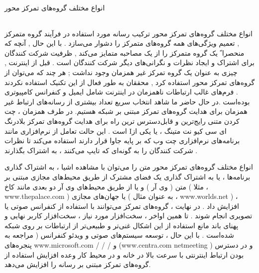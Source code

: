 \documentclass{beamer}
\begin{document}
\begin{persian}
\begin{frame}{انواع مختلف گروه‌های تمرکز محور}
\begin{tabular}{cccc}
	
	
\end{tabular}

\vspace{0.1cm}
\vspace{0.1cm}
\vspace{0.1cm}

\end{frame}


\begin{frame}{انواع مختلف گروه‌های تمرکز محور}
	ترکیب رسانه مورد استفاده در فرآیند گروه متمرکز , تعمیم ویژگی‌های همه گروه‌های متمرکز را دشوار می‌سازد . با این حال , آنچه که منحصرا ً یک گروه متمرکز را از یک مصاحبه متمایز می‌کند , ظرفیت شرکت کنندگان برای اشتراک و ایجاد نظرات و نگرانی‌های دیگر شرکت کنندگان است . قبل از اینترنت , چیزی به عنوان یک گروه تمرکز غیر همزمان وجود نداشت ; هر چند که می‌توان از گروه‌های تمرکز محور استفاده کرد , محققان به طور فعال از این تکنیک استفاده نکردند . فرم‌های غالب ارتباطات ناهمزمان در اینترنت شامل ایمیل و کنفرانس کامپیوتری بوده‌است .در حال حاضر ما شاهد انتخاب سریع تعداد بیشتری از رسانه‌های ارتباط غیر همزمان برای هدایت گروه‌های تمرکز مبتنی بر شبکه هستیم. در طرف همزمان ، چت کردن متنی رایج‌ترین و قابل‌دسترس ترین راه برای هدایت گروه‌های تمرکز بلادرنگ است . این حالت تعامل از نرم‌افزاری مانند Iای سی کیو نت متینگ ، یا یکی از برنامه‌های نرم‌افزاری چت وب که بر پایه جاوا قرار دارند استفاده می‌کند تا نظرات شرکت کنندگان را به گونه‌ای که تایپ می‌کنند ، به اشتراک بگذارند .
\end{frame}	
\begin{frame}{انواع مختلف گروه‌های تمرکز محور}
	متن را می‌توان با مشاهده اشیا ، به اشتراک گذاری برنامه‌ها ، یا به اشتراک گذاری یک فضای مشترک از طریق محیط‌های مجازی مبتنی بر متن ( وی آر ) و یا از طریق محیط‌های وی آر دو بعدی مانند کاخ ( مثلا ، www.thepalace.com ) یا جهان‌های مجازی ( به عنوان مثال ، www.worlds.net ) ، افزایش داد . در نهایت ، گروه‌های تمرکز می‌توانند با استفاده از کنفرانس صوتی یا تصویری انجام شوند . تا همین اواخر ، سخت‌افزار مورد نیاز ، سخت‌افزار کاربر نهایی و پهنای باند مانع استفاده از این اشکال غنی‌تر و طبیعی‌تر از ارتباطات بر روی شبکه شده‌است . با این حال ، توسعه سیستم‌های صوتی و ویدئو کنفرانس ( مراجعه به پنجره‌های www.microsoft.com / / / و (www.centra.com netmeeting ) و در دسترس بودن ارتباط اینترنتی با سرعت بالا در خانه و در محیط کار وعده افزایش استفاده از گروه‌های تمرکز مبتنی بر رسانه را افزایش می‌دهد. 


\end{frame}



\end{persian}
\end{document}
